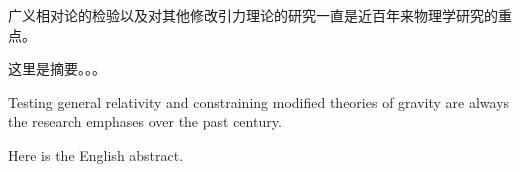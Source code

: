 
\begin{cabstract}
广义相对论的检验以及对其他修改引力理论的研究一直是近百年来物理学研究的重点。

这里是摘要。。。

\end{cabstract}

\begin{eabstract}
Testing general relativity and constraining modified theories of gravity are always the research emphases over the past century. 

Here is the English abstract.

\end{eabstract}
